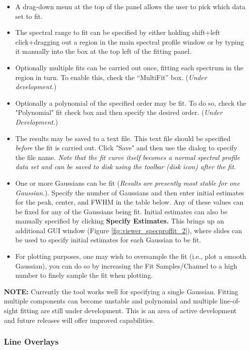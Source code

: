 \begin{itemize}
\item A drag-down menu at the top of the panel allows the user to pick which data set to fit.
\item The spectral range to fit can be specified by either holding shift+left click+dragging out a region in the 
main spectral profile window or by typing it manually into the box at the top left of the fitting panel.
\item Optionally multiple fits can be carried out once, fitting each spectrum in the region in turn. To enable this,
check the ``MultiFit'' box. ({\em Under development.})
\item Optionally a polynomial of the specified order may be fit. To do so, check the "Polynomial" fit check box
and then specify the desired order. ({\em Under Development.}) 
\item The results may be saved to a text file. This text file should be specified {\em before} the fit is carried out. Click
"Save" and then use the dialog to specify the file name. {\em Note that 
the fit curve itself becomes a normal spectral profile data set and can be saved to disk using the toolbar (disk icon) after the 
fit.}
\item One or more Gaussians can be fit ({\em Results are presently most stable for one Gaussian.}). Specify the number of
Gaussians and then enter initial estimates for the peak, center, and FWHM in the table below. Any of these values can be fixed
for any of the Gaussians being fit. Initial estimates can also be manually specified by clicking {\bf Specify Estimates.} This brings up an additional 
GUI window (Figure \ref{fig:viewer_specproffit_2}), where slides can be used to specify initial estimates for each Gaussian to be fit.
\item For plotting purposes, one may wish to oversample the fit (i.e., plot a smooth Gaussian), you can do so by increasing the Fit Samples/Channel
to a high number to finely sample the fit when plotting.
\end{itemize}

{\bf NOTE:} Currently the tool works well for specifying a single Gaussian. Fitting multiple components can become unstable and
polynomial and multiple line-of-sight fitting are still under development. This is an area of active development and future releases 
will offer improved capabilities.

\subsubsection{Line Overlays}
\label{section:display.image.specprof.lineoverlay}

